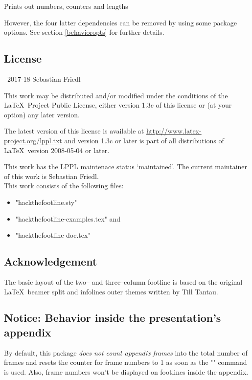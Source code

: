 \documentclass[11pt]{ltxdoc}
\begin{document}
	\medskip
	Prints out numbers, counters and lengths
	
	\bigskip
	However, the four latter dependencies can be removed by using some package options. See section \ref{behavioropts} for further details.
	
	
	\subsection*{License}
	\textcopyright\ 2017-18 Sebastian Friedl
	
	\smallskip
	This work may be distributed and/or modified under the conditions of the \LaTeX\ Project Public License, either version 1.3c of this license or (at your option) any later version.
	
	\smallskip
	The latest version of this license is available at \url{http://www.latex-project.org/lppl.txt} and version 1.3c or later is part of all distributions of \LaTeX\ version 2008-05-04 or later.
	
	\smallskip
	This work has the LPPL maintenace status \enquote*{maintained}. The current maintainer of this work is Sebastian Friedl. \\
	This work consists of the following files:
	\begin{itemize} \itemsep 0pt
		\item "hackthefootline.sty"
		\item "hackthefootline-examples.tex" and
		\item "hackthefootline-doc.tex"
	\end{itemize}
	
	
	\subsection*{Acknowledgement}
	The basic layout of the two-- and three--column footline is based on the original \LaTeX\ beamer split and infolines outer themes written by Till Tantau.
	
	
	\subsection*{Notice: Behavior inside the presentation's appendix}
	By default, this package \emph{does not count appendix frames} into the total number of frames and resets the counter for frame numbers to 1 as soon as the "\appendix" command is used. Also, frame numbers won't be displayed on footlines inside the appendix.
	
\end{document}

